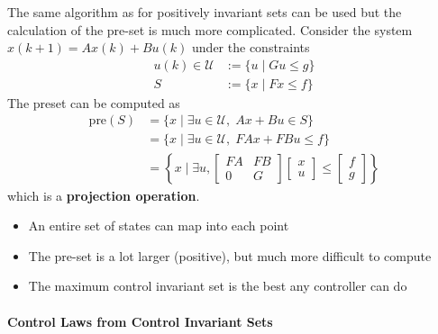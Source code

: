 The same algorithm as for positively invariant sets can be used but the calculation of the pre-set is much more complicated.
\newpar{}
Consider the system $x(k + 1) = A x(k) + B u(k)$ under the constraints
\begin{align*}
    u(k) \in \mathcal{U} & := \{u \mid G u \leq g \} \\
    S                    & := \{x \mid F x \leq f \}
\end{align*}
The preset can be computed as
\begin{align*}
    \text{pre}(S) & = \{x \mid \exists u \in \mathcal{U}, \; Ax + Bu \in S \}                                                                                                            \\
                  & = \{x \mid \exists u \in \mathcal{U}, \; F A x + F B u \leq f \}                                                                                                     \\
                  & = \left\{ x \mid \exists u, \begin{bmatrix} F A & F B \\ 0 & G \end{bmatrix} \begin{bmatrix} x \\ u \end{bmatrix} \leq \begin{bmatrix} f \\ g \end{bmatrix} \right\}
\end{align*}
which is a \textbf{projection operation}.

\newpar{}

\begin{itemize}
    \item An entire set of states can map into each point
    \item The pre-set is a lot larger (positive), but much more difficult to compute
    \item The maximum control invariant set is the best any controller can do
\end{itemize}

\paragraph{Control Laws from Control Invariant Sets}

